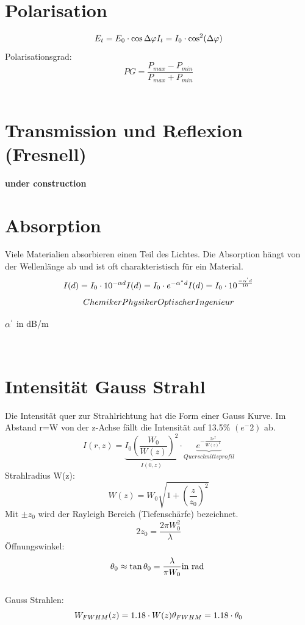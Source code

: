 \section{Polarisation}
\[
	E_t=E_0\cdot \cos\Delta\varphi \\
	I_t= I_0\cdot\cos^2(\Delta\varphi)
\]
Polarisationsgrad:
\[
	PG= \frac{P_{max}-P_{min}}{P_{max}+P_{min}}
\]
\\
\section{Transmission und Reflexion (Fresnell)}
\textbf{under construction}
\\
\section{Absorption}
Viele Materialien absorbieren einen Teil des Lichtes. Die Absorption hängt von der Wellenlänge ab und ist oft charakteristisch für ein Material.
\[
	I(d)=I_0\cdot 10^{-\alpha d} \\
	I(d)=I_0\cdot e^{-\alpha^* d} \\
	I(d)=I_0 \cdot 10^{\frac{-\alpha^` d}{10}}
\]
\[
	Chemiker \\ \\
	Physiker \\ \\ \\
	Optischer Ingenieur
\]
\begin{footnotesize}
	$\alpha^`$	in dB/m \\
\end{footnotesize}
\\
\section{Intensität Gauss Strahl}
Die Intensität quer zur Strahlrichtung hat die Form einer Gauss Kurve. Im Abstand r=W von der z-Achse fällt die Intensität auf 13.5\% $(e^-2)$ ab.
\[
	I(r,z)=\underbrace{I_0 \left(\frac{W_0}{W(z)}\right)^2}_{I(0,z)} 
	\cdot \underbrace{e^{-\frac{2r^2}{W(z)^2}}}_{Querschnittsprofil} 
\]
Strahlradius W(z):
\[
	W(z)=W_0\sqrt{1+\left( \frac{z}{z_0}\right) ^2}
\]
Mit $\pm z_0$ wird der Rayleigh Bereich (Tiefenschärfe) bezeichnet.
\[
	2z_0=\frac{2\pi W_0^2}{\lambda}
\]
Öffnungswinkel:
\[
	\theta_0 \approx \tan \theta_0 = \frac{\lambda}{\pi W_0} \\ \text{in rad } \\ \\
\]
\\
Gauss Strahlen:
\[
	W_{FWHM}(z)=1.18\cdot W(z) \\
	\theta_{FWHM} = 1.18 \cdot\theta_0 \\ \\
\]
\\
